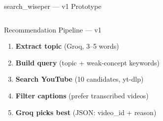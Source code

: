 \documentclass[aspectratio=169,9pt]{beamer}
\begin{document}
\begin{frame}{search\_wiseper — v1 Prototype}
\begin{columns}[T]
  \begin{block}{Recommendation Pipeline — v1}
    \small
    \begin{enumerate}
      \item \textbf{Extract topic} (Groq, 3--5 words)
      \item \textbf{Build query} (topic + weak-concept keywords)
      \item \textbf{Search YouTube} (10 candidates, yt-dlp)
      \item \textbf{Filter captions} (prefer transcribed videos)
      \item \textbf{Groq picks best} (JSON: video\_id + reason)
    \end{enumerate}
  \end{block}
\end{columns}
\end{frame}
\end{document}
